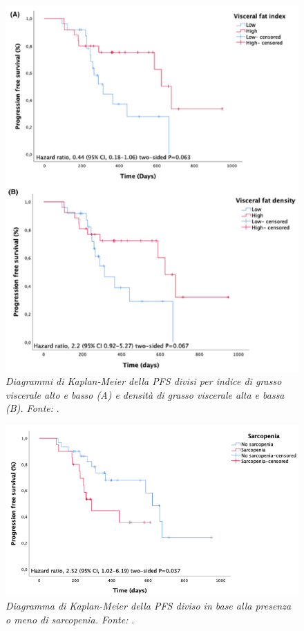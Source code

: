 \begin{figure}[htp]
\centering
\includegraphics[scale=1.2]{Immagini/franzoi_VAT.png}
\caption{\label{fig:franzoi_VAT} \textit{Diagrammi di Kaplan-Meier della PFS divisi per indice di grasso viscerale alto e basso (A) e densità di grasso viscerale alta e bassa (B). Fonte:} \cite{Franzoi2020}.}
\end{figure}
\begin{figure}[htp]
\centering
\includegraphics[scale=0.85]{Immagini/franzoi_sarcopenia.png}
\caption{\label{fig:franzoi_sarcopenia} \textit{Diagramma di Kaplan-Meier della PFS diviso in base alla presenza o meno di sarcopenia. Fonte:} \cite{Franzoi2020}.}
\end{figure}

